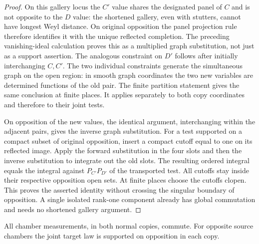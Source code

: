 \begin{proof}
On this gallery locus the $C'$ value shares the
designated panel of $C$ and is not opposite to the
$D$ value: the shortened gallery, even with stutters,
cannot have longest Weyl distance.  On original
opposition the panel projection rule therefore
identifies it with the unique reflected completion.
The preceding vanishing-ideal calculation proves
this as a multiplied graph substitution, not just
as a support assertion.  The analogous constraint
on $D'$ follows after initially interchanging
$C,C'$.  The two individual constraints generate
the simultaneous graph on the open region: in
smooth graph coordinates the two new variables are
determined functions of the old pair.  The finite
partition statement gives the same conclusion at
finite places.  It applies separately to both copy
coordinates and therefore to their joint tests.

On opposition of the new values, the identical
argument, interchanging within the adjacent pairs,
gives the inverse graph substitution.  For a test
supported on a compact subset of original opposition,
insert a compact cutoff equal to one on its reflected
image.  Apply the forward substitution in the four
slots and then the inverse substitution to integrate
out the old slots.  The resulting ordered integral
equals the integral against $P_{C'}P_{D'}$ of the
transported test.  All cutoffs stay inside their
respective opposition open sets.  At finite places
choose the cutoffs clopen.  This proves the asserted
identity without crossing the singular boundary of
opposition.  A single isolated rank-one component
already has global commutation and needs no shortened
gallery argument.
\end{proof}

\begin{proposition}
\label{prop:gluing-global-commutation}
All chamber measurements, in both normal copies,
commute.  For opposite source chambers the joint
target law is supported on opposition in each copy.
\end{proposition}

